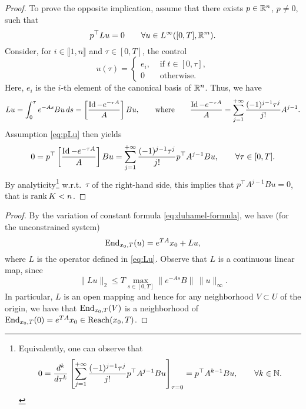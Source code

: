 \begin{proof}
    To prove the opposite implication, assume that there exists $p\in \mathbb{R}^n$, $p\neq0$, such that 
    \begin{equation}
        \label{eq:pLu}
        p^\top Lu=0\qquad \forall u\in L^\infty([0,T],\mathbb{R}^m). 
    \end{equation}
    Consider, for $i\in \llbracket 1,n\rrbracket$ and $\tau\in [0,T]$, the control 
    \begin{equation}
        u(\tau) = 
        \begin{cases}
            e_i, & \text{ if } t\in[0,\tau],\\
            0 & \text{ otherwise.}
        \end{cases}
    \end{equation}
    Here, $e_i$ is the $i$-th element of the canonical basis of $\mathbb{R}^n$. Thus, we have
    \begin{equation}
        Lu = \int_0^\tau e^{-As}Bu\,ds = \left[\frac{\operatorname{Id} - e^{-\tau A}}{A}\right] B u, \qquad
        \text{where}\qquad 
        \frac{\operatorname{Id} - e^{-\tau A}}{A} = \sum_{j=1}^{+\infty} \frac{(-1)^{j-1}\tau^j}{j!}A^{j-1}.
    \end{equation}
    Assumption \eqref{eq:pLu} then yields 
    \begin{equation}
       0 = p^\top\left[\frac{\operatorname{Id} - e^{-\tau A}}{A}\right]Bu = \sum_{j=1}^{+\infty} \frac{(-1)^{j-1}\tau^j}{j!}p^{\top}A^{j-1}Bu , 
       \qquad \forall \tau\in [0,T].
    \end{equation}
    By analyticity\footnote{Equivalently, one can observe that $$0=\frac{d^k}{d\tau^k}\left[\sum_{j=1}^{+\infty} \frac{(-1)^{j-1}\tau^j}{j!}p^{\top}A^{j-1}Bu\right]_{\tau =0} = p^\top A^{k-1}Bu, \qquad \forall k\in\mathbb{N}.$$} w.r.t.~$\tau$ of the right-hand side, this implies that $p^\top A^{j-1}Bu=0$, that is $\operatorname{rank} K<n$.
\end{proof}


\begin{proof}
    By the variation of constant formula \eqref{eq:duhamel-formula}, we have (for the unconstrained system)
    \begin{equation}
        \operatorname{End}_{x_0,T}(u) = e^{TA}x_0 + Lu,
    \end{equation}
    where $L$ is the operator defined in \eqref{eq:Lu}. 
    Observe that $L$ is a continuous linear map, since 
    \begin{equation}
        \|Lu\|_2 \le T \max_{s\in [0,T]} \|e^{-As}B\| \, \|u\|_\infty.
    \end{equation}
    In particular, $L$ is an open mapping and hence for any neighborhood $V\subset U$ of the origin, we have that $\operatorname{End}_{x_0,T}(V)$ is a neighborhood of $\operatorname{End}_{x_0,T}(0)= e^{TA}x_0\in\operatorname{Reach}(x_0,T)$.
\end{proof}



